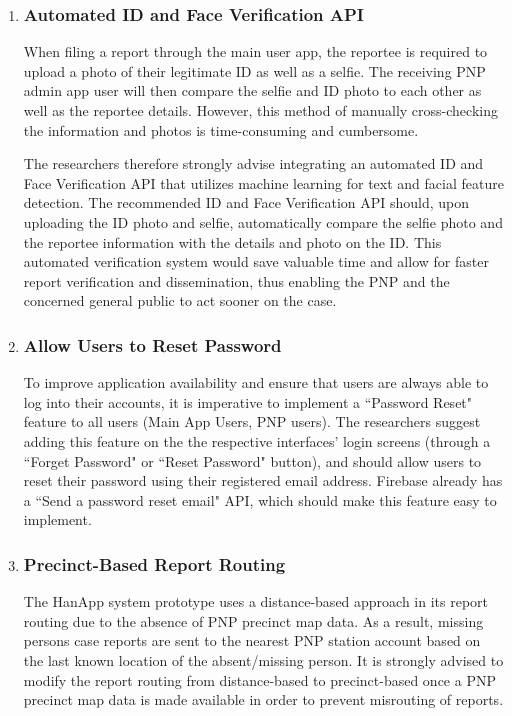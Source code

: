 \begin{enumerate}
    \item \subsubsection{Automated ID and Face Verification API}
When filing a report through the main user app, the reportee is required to upload a photo of their legitimate ID as well as a selfie. The receiving PNP admin app user will then compare the selfie and ID photo to each other as well as the reportee details. However, this method of manually cross-checking the information and photos is time-consuming and cumbersome. 

The researchers therefore strongly advise integrating an automated ID and Face Verification API that utilizes machine learning for text and facial feature detection. The recommended ID and Face Verification API should, upon uploading the ID photo and selfie, automatically compare the selfie photo and the reportee information with the details and photo on the ID. This automated verification system would save valuable time and allow for faster report verification and dissemination, thus enabling the PNP and the concerned general public to act sooner on the case.
    
    \item \subsubsection{Allow Users to Reset Password}
To improve application availability and ensure that users are always able to log into their accounts, it is imperative to implement a ``Password Reset" feature to all users (Main App Users, PNP users). The researchers suggest adding this feature on the the respective interfaces' login screens (through a ``Forget Password" or ``Reset Password" button), and should allow users to reset their password using their registered email address. Firebase already has a ``Send a password reset email" API, which should make this feature easy to implement.

    \item \subsubsection{Precinct-Based Report Routing}

The HanApp system prototype uses a distance-based approach in its report routing due to the absence of PNP precinct map data. As a result, missing persons case reports are sent to the nearest PNP station account based on the last known location of the absent/missing person. It is strongly advised to modify the report routing from distance-based to precinct-based once a PNP precinct map data is made available in order to prevent misrouting of reports. 


\end{enumerate}
